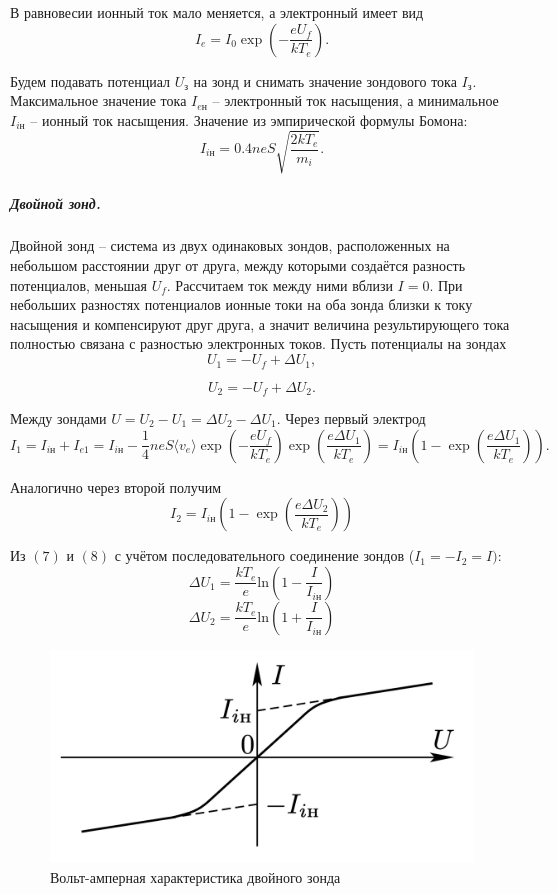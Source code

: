 \documentclass[12pt,a4paper]{article}
\begin{document}
В равновесии ионный ток мало меняется, а электронный имеет вид
\[I_e = I_0 \exp\left( -\dfrac{eU_f}{kT_e} \right).\]

Будем подавать потенциал $U_\text{з}$ на зонд и снимать значение зондового тока $I_\text{з}$. 
Максимальное значение тока $I_{e\text{н}}$ -- электронный ток насыщения, а минимальное $I_{i\text{н}}$ -- ионный ток насыщения. 
Значение из эмпирической формулы Бомона:
\begin{equation}
    I_{i\text{н}} = 0.4 neS \sqrt{\dfrac{2kT_e}{m_i}}.
\end{equation}

\subparagraph*{Двойной зонд.}
Двойной зонд -- система из двух одинаковых зондов, расположенных на небольшом расстоянии друг от друга, между которыми создаётся разность потенциалов, меньшая $U_f$. 
Рассчитаем ток между ними вблизи $I=0$. 
При небольших разностях потенциалов ионные токи на оба зонда близки к току насыщения и компенсируют друг друга, а значит величина результирующего тока полностью связана с разностью электронных токов. 
Пусть потенциалы на зондах
\[U_1 = -U_f + \Delta U_1,\]

\[U_2 = -U_f + \Delta U_2.\]

Между зондами $U = U_2 - U_1 = \Delta U_2 - \Delta U_1$.
Через первый электрод
\begin{equation}
    I_1 = I_{iн} + I_{e1} = I_{iн} - \dfrac{1}{4}neS\langle v_e\rangle \exp\left(-\dfrac{eU_f}{kT_e}\right)\exp\left(\dfrac{e\Delta U_1}{kT_e}\right)=I_{iн}\left(1 - \exp\left( \dfrac{e\Delta U_1}{kT_e} \right)\right).
\end{equation}

Аналогично через второй получим
\begin{equation}
    I_2 = I_{iн}\left(1 - \exp\left( \dfrac{e\Delta U_2}{kT_e} \right)\right)
\end{equation}
  
Из $(7)$ и $(8)$ с учётом последовательного соединение зондов ($I_1 = -I_2 = I)$:
\[\Delta U_1= \dfrac{kT_e}{e}\text{ln}\left(1 - \dfrac{I}{I_{iн}}\right)\]
\[\Delta U_2= \dfrac{kT_e}{e}\text{ln}\left(1 + \dfrac{I}{I_{iн}}\right)\]

\begin{figure}
    \includegraphics[width=\linewidth]{pics/3.png}
    \caption{\small{Вольт-амперная характеристика двойного зонда}}
\end{figure}
\end{document}
